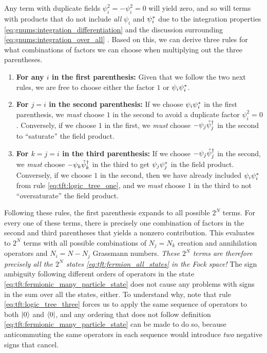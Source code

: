 Any term with duplicate fields $\psi_i^2 = -\psi_i^2 = 0$ will yield zero, and so will terms with products that do not include \emph{all} $\psi_i$ and ${\psi}^*_i$ due to the integration properties \eqref{eq:gnums:integration_differentiation} and the discussion surrounding \cref{eq:gnums:integration_over_all} .
Based on this, we can derive three rules for what combinations of factors we can choose when multiplying out the three parentheses. 
\begin{enumerate}
\item \textbf{For any $i$ in the first parenthesis:} Given that we follow the two next rules, we are free to choose either the factor $1$ or $\psi_i {\psi}^*_i$. \label{eq:tft:logic_tree_one}
\item \textbf{For $j=i$ in the second parenthesis:} 
If we choose $\psi_i {\psi}^*_i$ in the first parenthesis, we \emph{must} choose $1$ in the second to avoid a duplicate factor $\psi_i^2 = 0$.
Conversely, if we choose $1$ in the first, we \emph{must} choose $-\psi_j \hat\psi^\dagger_j$ in the second to ``saturate'' the field product.
\item \textbf{For $k = j = i$ in the third parenthesis:} 
If we choose $-\psi_j \hat\psi^\dagger_j$ in the second, we \emph{must} choose $-\psi_k \hat\psi^\dagger_k$ in the third to get $\psi_j {\psi}^*_j$ in the field product.
Conversely, if we choose $1$ in the second, then we have already included $\psi_i {\psi}^*_i$ from rule \ref{eq:tft:logic_tree_one}, and we \emph{must} choose $1$ in the third to not ``oversaturate'' the field product. \label{eq:tft:logic_tree_three}
\end{enumerate}
Following these rules, the first parenthesis expands to all possible $2^N$ terms.
For every one of these terms, there is precisely one combination of factors in the second and third parentheses that yields a nonzero contribution.
This evaluates to $2^N$ terms with all possible combinations of $N_j = N_k$ creation and annihilation operators and $N_i = N - N_j$ Grassmann numbers.
\emph{These $2^N$ terms are therefore precisely all the $2^N$ states \eqref{eq:tft:fermion_all_states} in the Fock space!}
The sign ambiguity following different orders of operators in the state \eqref{eq:tft:fermionic_many_particle_state} does not cause any problems with signs in the sum over all the states, either.
To understand why, note that rule \ref{eq:tft:logic_tree_three} forces us to apply the same sequence of operators to both $\ket{0}$ and $\bra{0}$, and any ordering that does not follow definition \eqref{eq:tft:fermionic_many_particle_state} can be made to do so, because anticommuting the same operators in each sequence would introduce \emph{two} negative signs that cancel.
